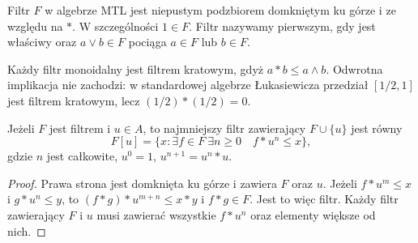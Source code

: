 \begin{definicja}\label{def:lst-fuzzy-filter}
Filtr $F$ w algebrze MTL jest niepustym podzbiorem domkniętym
ku górze i ze względu na $*$. W szczególności $1\in F$.
Filtr nazywamy pierwszym, gdy jest właściwy oraz
$a\vee b\in F$ pociąga $a\in F$ lub $b\in F$.
\end{definicja}
Każdy filtr monoidalny jest filtrem kratowym, gdyż
$a*b\leq a\wedge b$. Odwrotna implikacja nie zachodzi:
w standardowej algebrze Łukasiewicza przedział $[1/2,1]$
jest filtrem kratowym, lecz $(1/2)*(1/2)=0$.

\begin{lemat}
\label{lem:lst-fuzzy-generated-filter}
Jeżeli $F$ jest filtrem i $u\in A$, to najmniejszy filtr
zawierający $F\cup\{u\}$ jest równy
\[
 F[u]=\{x:\exists f\in F\ \exists n\geq0\quad f*u^n\leq x\},
\]
gdzie $n$ jest całkowite, $u^0=1$, $u^{n+1}=u^n*u$.
\end{lemat}
\begin{proof}
Prawa strona jest domknięta ku górze i zawiera $F$ oraz $u$.
Jeżeli $f*u^m\leq x$ i $g*u^n\leq y$, to
$(f*g)*u^{m+n}\leq x*y$ i $f*g\in F$.
Jest to więc filtr. Każdy filtr zawierający $F$ i $u$ musi
zawierać wszystkie $f*u^n$ oraz elementy większe od nich.
\end{proof}

